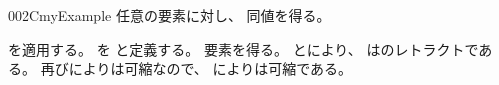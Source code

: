 \documentclass[index]{subfiles}
\begin{document}
\begin{myBlock}{002C}{myExample}
  任意の要素に対し、
  同値を得る。
\end{myBlock}
\begin{myProof}
  を適用する。
  を
  と定義する。
  要素を得る。
  とにより、
  はのレトラクトである。
  再びによりは可縮なので、
  によりは可縮である。
\end{myProof}
\end{document}
